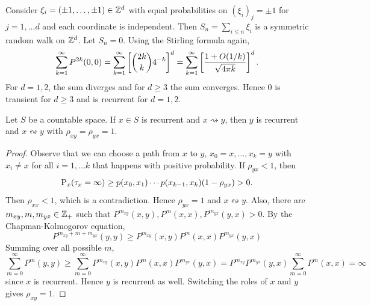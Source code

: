 \begin{example}
    Consider $\xi_i = (\pm 1,\ldots, \pm 1)\in\Z^d$ with equal probabilities on 
    $(\xi_i)_j = \pm 1$ for $j=1,\ldots d$ and each coordinate is independent. 
    Then $S_n = \sum_{i\leq n} \xi_i$ is a symmetric random walk on $\Z^d$. 
    Let $S_n = 0$. Using the Stirling formula again, 
    \begin{equation*}
        \sum_{k=1}^\infty P^{2k}(0,0) = \sum_{k=1}^\infty\sbrc{\binom{2k}{k}4^{-k}}^d 
        = \sum_{k=1}^\infty\sbrc{\frac{1+O(1/k)}{\sqrt{4\pi k}}}^d. 
    \end{equation*}
    For $d = 1,2$, the sum diverges and for $d\geq 3$ the sum converges. 
    Hence $0$ is transient for $d\geq 3$ and is recurrent for $d = 1,2$. 
\end{example}

\begin{theorem}\label{thm:recurrent_class}
    Let $S$ be a countable space. If $x\in S$ is recurrent and $x\rightsquigarrow y$, 
    then $y$ is recurrent and $x\leftrightsquigarrow y$ with $\rho_{xy} 
    = \rho_{yx} = 1$. 
\end{theorem}
\begin{proof}
    Observe that we can choose a path from $x$ to $y$, $x_0 = x,\ldots,x_k = y$ 
    with $x_i\neq x$ for all $i = 1,\ldots k$ that happens with positive probability. 
    If $\rho_{yx}<1$, then 
    \begin{equation*}
        \P_x(\tau_{x}=\infty) \geq p(x_0,x_1)\cdots p(x_{k-1},x_k)(1 - \rho_{yx}) > 0.
    \end{equation*}
    Then $\rho_{xx} < 1$, which is a contradiction. Hence $\rho_{yx} = 1$ 
    and $x\leftrightsquigarrow y$. Also, there are $m_{xy},m,m_{yx}\in \Z_+$ 
    such that $P^{m_{xy}}(x,y),P^{m}(x,x),P^{m_{yx}}(y,x)>0$. By the 
    Chapman-Kolmogorov equation, 
    \begin{equation*}
        P^{m_{xy}+m+m_{yx}}(y,y)\geq P^{m_{xy}}(x,y)P^{m}(x,x)P^{m_{yx}}(y,x)
    \end{equation*}
    Summing over all possible $m$, 
    \begin{equation*}
        \sum_{m=0}^\infty P^{m}(y,y)\geq \sum_{m=0}^\infty P^{m_{xy}}(x,y)P^{m}(x,x)P^{m_{yx}}(y,x) 
        = P^{m_{xy}}P^{m_{yx}}(y,x) \sum_{m=0}^\infty P^{m}(x,x) = \infty
    \end{equation*}
    since $x$ is recurrent. Hence $y$ is recurrent as well. Switching the 
    roles of $x$ and $y$ gives $\rho_{xy} = 1$. 
\end{proof}

